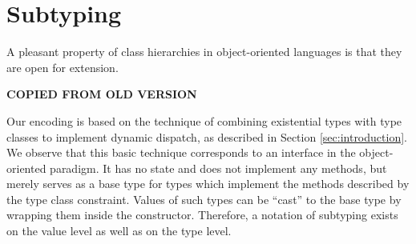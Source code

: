 \section{Subtyping}
\label{sec:encoding}

A pleasant property of class hierarchies in object-oriented languages is that they are open for extension.

\textbf{COPIED FROM OLD VERSION}

Our encoding is based on the technique of combining existential types with type classes to implement dynamic dispatch, as described in Section \ref{sec:introduction}. We observe that this basic technique corresponds to an interface in the object-oriented paradigm. It has no state and does not implement any methods, but merely serves as a base type for types which implement the methods described by the type class constraint. Values of such types can be ``cast'' to the base type by wrapping them inside the constructor. Therefore, a notation of subtyping exists on the value level as well as on the type level.

